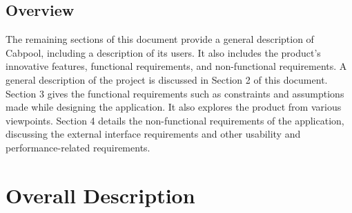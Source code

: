 \documentclass[english]{article}
\begin{document}

\subsection{Overview}
\label{sub:overview}
The remaining sections of this document provide a general description of Cabpool, including a description of its users. It also includes the product's innovative features, functional requirements, and non-functional requirements. A general description of the project is discussed in Section 2 of this document. Section 3 gives the functional requirements such as constraints and assumptions made while designing the application. It also explores the product from various viewpoints. Section 4 details the non-functional requirements of the application, discussing the external interface requirements and other usability and performance-related requirements.


\section{Overall Description}
\label{sec:overall_description}
\end{document}
